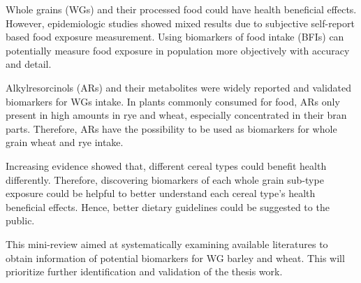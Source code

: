 Whole grains (WGs) and their processed food could have health beneficial effects. However, epidemiologic studies showed mixed results due to subjective self-report based food exposure measurement\cite{ISI:000447355100002}. Using biomarkers of food intake (BFIs) can potentially measure food exposure in population more objectively with accuracy and detail\cite{Scalbert2014}.

Alkylresorcinols (ARs) and their metabolites were widely reported and validated biomarkers for WGs intake. 
In plants commonly consumed for food, ARs only present in high amounts in rye and wheat, especially concentrated in their bran parts\cite{arreview2004}. Therefore, ARs have the possibility to be used as biomarkers for whole grain wheat and rye intake.

Increasing evidence showed that, different cereal types could benefit health differently. Therefore, discovering biomarkers of each whole grain sub-type exposure could be helpful to better understand each cereal type's health beneficial effects. Hence, better dietary guidelines could be suggested to the public.

This mini-review aimed at systematically examining available literatures to obtain information of potential biomarkers for WG barley and wheat. This will prioritize further identification and validation of the thesis work.
